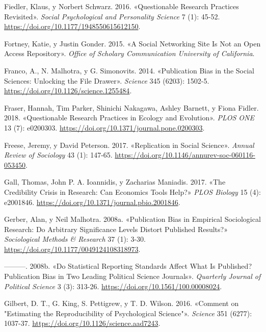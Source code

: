 \documentclass[
  spanish,
  a4paper,
  oneside]{scrbook}
\newlength{\cslhangindent}
\newenvironment{CSLReferences}[2] %
 {\begin{list}{}{%
  \setlength{\itemindent}{0pt}
  \setlength{\leftmargin}{0pt}
  \setlength{\parsep}{0pt}
  \ifodd #1
   \setlength{\leftmargin}{\cslhangindent}
   \setlength{\itemindent}{-1\cslhangindent}
  \fi
  \setlength{\itemsep}{#2\baselineskip}}}
 {\end{list}}
\begin{document}
\begin{CSLReferences}{1}{0}
Fiedler, Klaus, y Norbert Schwarz. 2016. {«Questionable {Research
Practices Revisited}»}. \emph{Social Psychological and Personality
Science} 7 (1): 45-52. \url{https://doi.org/10.1177/1948550615612150}.

Fortney, Katie, y Justin Gonder. 2015. {«A Social Networking Site Is Not
an Open Access Repository»}. \emph{Office of Scholary Communication
University of California}.

Franco, A., N. Malhotra, y G. Simonovits. 2014. {«Publication Bias in
the Social Sciences: {Unlocking} the File Drawer»}. \emph{Science} 345
(6203): 1502-5. \url{https://doi.org/10.1126/science.1255484}.

Fraser, Hannah, Tim Parker, Shinichi Nakagawa, Ashley Barnett, y Fiona
Fidler. 2018. {«Questionable Research Practices in Ecology and
Evolution»}. \emph{PLOS ONE} 13 (7): e0200303.
\url{https://doi.org/10.1371/journal.pone.0200303}.

Freese, Jeremy, y David Peterson. 2017. {«Replication in {Social
Science}»}. \emph{Annual Review of Sociology} 43 (1): 147-65.
\url{https://doi.org/10.1146/annurev-soc-060116-053450}.

Gall, Thomas, John P. A. Ioannidis, y Zacharias Maniadis. 2017. {«The
Credibility Crisis in Research: {Can} Economics Tools Help?»} \emph{PLOS
Biology} 15 (4): e2001846.
\url{https://doi.org/10.1371/journal.pbio.2001846}.

Gerber, Alan, y Neil Malhotra. 2008a. {«Publication {Bias} in {Empirical
Sociological Research}: {Do Arbitrary Significance Levels Distort
Published Results}?»} \emph{Sociological Methods \& Research} 37 (1):
3-30. \url{https://doi.org/10.1177/0049124108318973}.

---------. 2008b. {«Do {Statistical Reporting Standards Affect What Is
Published}? {Publication Bias} in {Two Leading Political Science
Journals}»}. \emph{Quarterly Journal of Political Science} 3 (3):
313-26. \url{https://doi.org/10.1561/100.00008024}.

Gilbert, D. T., G. King, S. Pettigrew, y T. D. Wilson. 2016. {«Comment
on "{Estimating} the Reproducibility of Psychological Science"»}.
\emph{Science} 351 (6277): 1037-37.
\url{https://doi.org/10.1126/science.aad7243}.


\end{CSLReferences}
\end{document}
